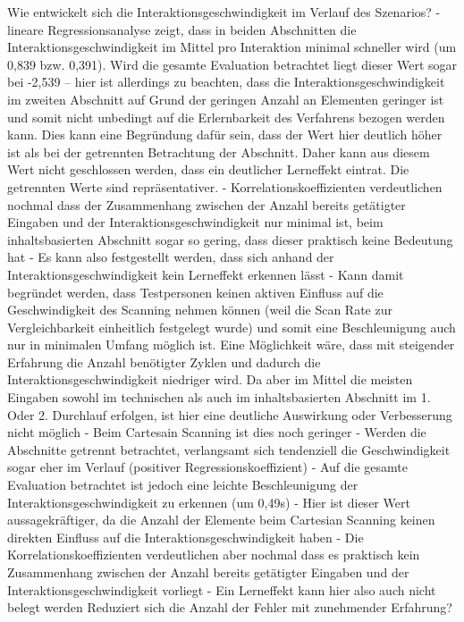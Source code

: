Wie entwickelt sich die Interaktionsgeschwindigkeit im Verlauf des Szenarios? 
-	lineare Regressionsanalyse zeigt, dass in beiden Abschnitten die Interaktionsgeschwindigkeit im Mittel pro Interaktion minimal schneller wird (um 0,839 bzw. 0,391). Wird die gesamte Evaluation betrachtet liegt dieser Wert sogar bei -2,539 – hier ist allerdings zu beachten, dass die Interaktionsgeschwindigkeit im zweiten Abschnitt auf Grund der geringen Anzahl an Elementen geringer ist und somit nicht unbedingt auf die Erlernbarkeit des Verfahrens bezogen werden kann. Dies kann eine Begründung dafür sein, dass der Wert hier deutlich höher ist als bei der getrennten Betrachtung der Abschnitt. Daher kann aus diesem Wert nicht geschlossen werden, dass ein deutlicher Lerneffekt eintrat. Die getrennten Werte sind repräsentativer.
-	Korrelationskoeffizienten verdeutlichen nochmal dass der Zusammenhang zwischen der Anzahl bereits getätigter Eingaben und der Interaktionsgeschwindigkeit nur minimal ist, beim inhaltsbasierten Abschnitt sogar so gering, dass dieser praktisch keine Bedeutung hat 
-	Es kann also festgestellt werden, dass sich anhand der Interaktionsgeschwindigkeit kein Lerneffekt erkennen lässt 
-	Kann damit begründet werden, dass Testpersonen keinen aktiven Einfluss auf die Geschwindigkeit des Scanning nehmen können (weil die Scan Rate zur Vergleichbarkeit einheitlich festgelegt wurde) und somit eine Beschleunigung auch nur in minimalen Umfang möglich ist. Eine Möglichkeit wäre, dass mit steigender Erfahrung die Anzahl benötigter Zyklen und dadurch die Interaktionsgeschwindigkeit niedriger wird. Da aber im Mittel die meisten Eingaben sowohl im technischen als auch im inhaltsbasierten Abschnitt im 1. Oder 2. Durchlauf erfolgen, ist hier eine deutliche Auswirkung oder Verbesserung nicht möglich 
-	Beim Cartesain Scanning ist dies noch geringer 
-	Werden die Abschnitte getrennt betrachtet, verlangsamt sich tendenziell die Geschwindigkeit sogar eher im Verlauf (positiver Regressionskoeffizient)
-	Auf die gesamte Evaluation betrachtet ist jedoch eine leichte Beschleunigung der Interaktionsgeschwindigkeit zu erkennen (um 0,49s)  
-	Hier ist dieser Wert aussagekräftiger, da die Anzahl der Elemente beim Cartesian Scanning keinen direkten Einfluss auf die Interaktionsgeschwindigkeit haben 
-	Die Korrelationskoeffizienten verdeutlichen aber nochmal dass es praktisch kein Zusammenhang zwischen der Anzahl bereits getätigter Eingaben und der Interaktionsgeschwindigkeit vorliegt 
-	Ein Lerneffekt kann hier also auch nicht belegt werden 
Reduziert sich die Anzahl der Fehler mit zunehmender Erfahrung?
